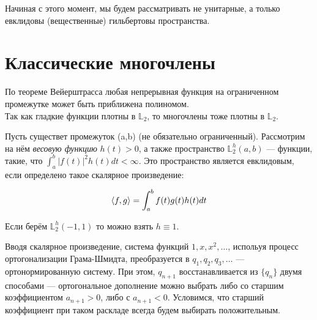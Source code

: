 \documentclass[12pt]{article}
\begin{document}
		Начиная с этого момент, мы будем рассматривать не унитарные, а только евклидовы (вещественные) гильбертовы пространства.
	
		\section{Классические многочлены}
		По теореме Вейерштрасса любая непрерывная функция на ограниченном промежутке может быть приближена полиномом. \\
		Так как гладкие функции плотны в $\mathbb{L}_2$, то многочлены тоже плотны в $\mathbb{L}_2$.
	
		Пусть существет промежуток (a,b) (не обязательно ограниченный). Рассмотрим на нём \textit{весовую функцию} 
		$h(t) > 0$, а также пространство
		$\mathbb{L}_2^h (a,b)$ --- функции, такие, что $\int_a^b |f(t)|^2 h(t) dt < \infty$.
		Это пространство является евклидовым, если определено такое скалярное произведение:
	
		$$ \left\langle f, g \right\rangle = \int_a^b f(t) g(t) h(t) dt $$
	
		Если берём $\mathbb{L}_2^h (-1, 1)$ то можно взять $h \equiv 1$.
	
		Вводя скалярное произведение, система функций
		$1, x, x^2, \ldots$, испольуя процесс ортогонализации Грама-Шмидта, преобразуется в $q_1, q_2, q_3, \ldots$ --- ортонормированную 
		систему. При этом, $q_{n+1}$ восстанавливается из $ \{ q_n \} $ двумя способами --- ортогональное дополнение можно выбрать либо
		со старшим коэффициентом $a_{n+1} > 0$, либо с $a_{n+1} < 0$. Условимся, что старший коэффициент при таком раскладе всегда будем 
		выбирать положительным.
	
\end{document}
